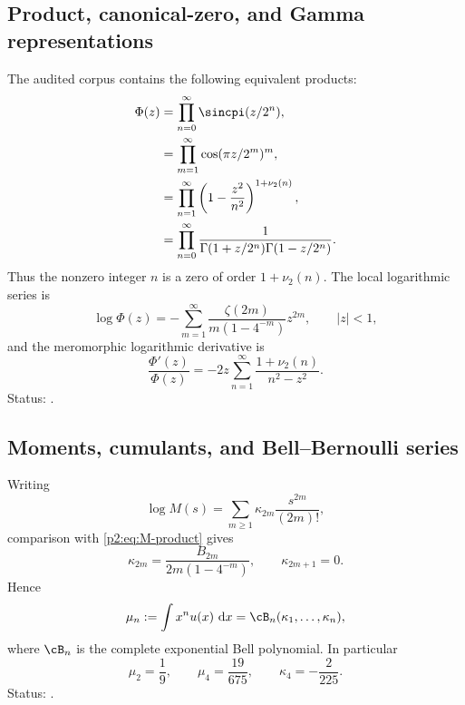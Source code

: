 \documentclass[11pt,oneside]{article}
\theoremstyle{definition}
\newcommand{\dd}{\,\mathrm d}
\newcommand{\vtwo}{\nu_2}
\begin{document}
\subsection{Product, canonical-zero, and Gamma representations}

The audited corpus contains the following equivalent products:
\begin{align}
 \Phi(z)
 &=\prod_{n=0}^{\infty}\sincpi(z/2^n),                     \label{p2:eq:atlas-sinc}\\
 &=\prod_{m=1}^{\infty}\cos(\pi z/2^m)^m,                  \label{p2:eq:atlas-cos}\\
 &=\prod_{n=1}^{\infty}\left(1-\frac{z^2}{n^2}\right)^{1+\vtwo(n)}, \label{p2:eq:atlas-canonical}\\
 &=\prod_{n=0}^{\infty}
   \frac1{\Gamma(1+z/2^n)\Gamma(1-z/2^n)}.                \label{p2:eq:atlas-gamma}
\end{align}
Thus the nonzero integer $n$ is a zero of order $1+\vtwo(n)$.  The local
logarithmic series is
\begin{equation}
 \log\Phi(z)=-\sum_{m=1}^{\infty}
 \frac{\zeta(2m)}{m(1-4^{-m})}z^{2m},\qquad |z|<1,          \label{p2:eq:atlas-log-zeta}
\end{equation}
and the meromorphic logarithmic derivative is
\begin{equation}
 \frac{\Phi'(z)}{\Phi(z)}
 =-2z\sum_{n=1}^{\infty}\frac{1+\vtwo(n)}{n^2-z^2}.        \label{p2:eq:atlas-log-derivative}
\end{equation}
Status: \statusknown.

\subsection{Moments, cumulants, and Bell--Bernoulli series}

Writing
\begin{equation}
 \log M(s)=\sum_{m\ge1}\kappa_{2m}\frac{s^{2m}}{(2m)!},    \label{p2:eq:cumulant-def}
\end{equation}
comparison with \eqref{p2:eq:M-product} gives
\begin{equation}
 \kappa_{2m}=\frac{B_{2m}}{2m(1-4^{-m})},
 \qquad \kappa_{2m+1}=0.                                  \label{p2:eq:full-cumulants}
\end{equation}
Hence
\begin{equation}
 \mu_n:=\int x^n u(x)\,\dd x
 =\cB_n(\kappa_1,\ldots,\kappa_n),                         \label{p2:eq:Bell-moments}
\end{equation}
where $\cB_n$ is the complete exponential Bell polynomial.  In particular
\begin{equation}
 \mu_2=\frac19,\qquad \mu_4=\frac{19}{675},\qquad
 \kappa_4=-\frac2{225}.                                   \label{p2:eq:first-moments}
\end{equation}
Status: \statusknown.
\end{document}
